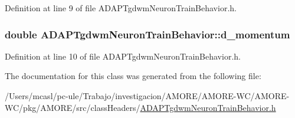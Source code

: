 Definition at line 9 of file ADAPTgdwmNeuronTrainBehavior.h.

\hypertarget{class_a_d_a_p_tgdwm_neuron_train_behavior_a51a564625b458fcb7ee469de1e00ffd7}{
\subsubsection[{d\_\-momentum}]{\setlength{\rightskip}{0pt plus 5cm}double {\bf ADAPTgdwmNeuronTrainBehavior::d\_\-momentum}}}
\label{class_a_d_a_p_tgdwm_neuron_train_behavior_a51a564625b458fcb7ee469de1e00ffd7}


Definition at line 10 of file ADAPTgdwmNeuronTrainBehavior.h.



The documentation for this class was generated from the following file:\begin{DoxyCompactItemize}
\item 
/Users/mcasl/pc-\/ule/Trabajo/investigacion/AMORE/AMORE-\/WC/AMORE-\/WC/pkg/AMORE/src/classHeaders/\hyperlink{_a_d_a_p_tgdwm_neuron_train_behavior_8h}{ADAPTgdwmNeuronTrainBehavior.h}\end{DoxyCompactItemize}
